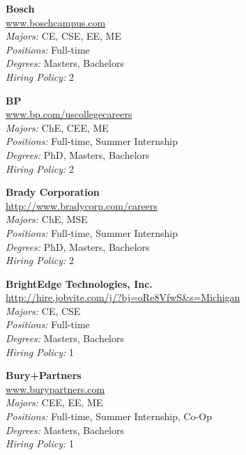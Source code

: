 \documentclass{article}
\begin{document}
\begin{center}
\begin{multicols}{3}
\begin{minipage}{.9\columnwidth}{\Large\bf Bosch }\\
	\url{www.boschcampus.com}\\
	\emph{Majors:} CE, CSE, EE, ME\\
	\emph{Positions:} Full-time\\
	\emph{Degrees:} Masters, Bachelors\\
	\emph{Hiring Policy:} 2\\
\end{minipage}
 
\begin{minipage}{.9\columnwidth}{\Large\bf BP }\\
	\url{www.bp.com/uscollegecareers}\\
	\emph{Majors:} ChE, CEE, ME\\
	\emph{Positions:} Full-time, Summer Internship\\
	\emph{Degrees:} PhD, Masters, Bachelors\\
	\emph{Hiring Policy:} 2\\
\end{minipage}
 
\begin{minipage}{.9\columnwidth}{\Large\bf Brady Corporation }\\
	\url{http://www.bradycorp.com/careers}\\
	\emph{Majors:} ChE, MSE\\
	\emph{Positions:} Full-time, Summer Internship\\
	\emph{Degrees:} PhD, Masters, Bachelors\\
	\emph{Hiring Policy:} 2\\
\end{minipage}
 
\begin{minipage}{.9\columnwidth}{\Large\bf BrightEdge Technologies, Inc. }\\
	\url{http://hire.jobvite.com/j/?bj=oRe8VfwS&s=Michigan}\\
	\emph{Majors:} CE, CSE\\
	\emph{Positions:} Full-time\\
	\emph{Degrees:} Masters, Bachelors\\
	\emph{Hiring Policy:} 1\\
\end{minipage}
 
\begin{minipage}{.9\columnwidth}{\Large\bf Bury+Partners }\\
	\url{www.burypartners.com}\\
	\emph{Majors:} CEE, EE, ME\\
	\emph{Positions:} Full-time, Summer Internship, Co-Op\\
	\emph{Degrees:} Masters, Bachelors\\
	\emph{Hiring Policy:} 1\\
\end{minipage}
 

\end{multicols}
\end{center}
\end{document}
